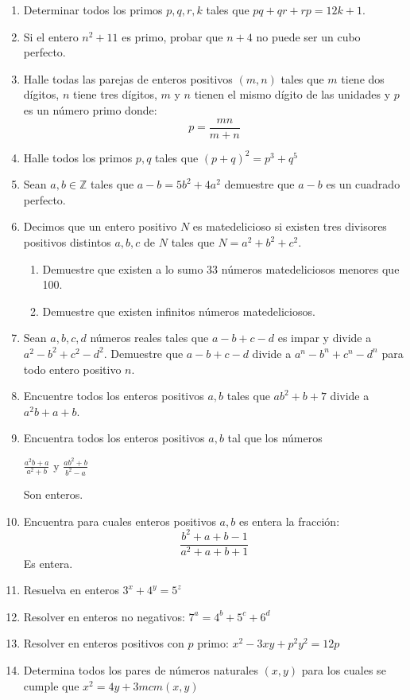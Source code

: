 \documentclass{book}
\newcommand{\Z}{\mathbb{Z}} \def\max{\mathop{\mbox{\rm máx}}} %
\begin{document}
\begin{enumerate}
		\item Determinar todos los primos $p,q,r,k$ tales que $pq+qr+rp= 12k + 1$. 
		\item Si el entero $n^2 + 11$ es primo, probar que $n + 4$ no puede ser un cubo perfecto. 
		\item Halle todas las parejas de enteros positivos $(m,n)$ tales que $m$ tiene dos dígitos, $n$ tiene tres dígitos, $m$ y 					$n$ tienen el mismo dígito de las unidades y $p$ es un número primo donde:
			$$p=\frac{mn}{m+n}$$
		\item Halle todos los primos $p,q$ tales que ${(p+q)}^2 = p^3+q^5$ 
		\item Sean $a,b\in \Z$ tales que $a-b=5b^2+4a^2$ demuestre que $a-b$ es un cuadrado perfecto.
		\item Decimos que un entero positivo $N$ es matedelicioso si existen tres divisores positivos distintos $a,b,c$ de $N$ tales que $N = a^2 + b^2 + c^2$.
			\begin{enumerate}
				 \item Demuestre que existen a lo sumo 33 números matedeliciosos menores que 100.  
				 \item Demuestre que existen infinitos números matedeliciosos. 
			\end{enumerate}
		\item Sean $a,b,c,d$ números reales tales que $a-b+c-d$ es impar y divide a $a^2-b^2+c^2-d^2$. Demuestre que
			$a-b+c-d$ divide a $a^n-b^n+c^n-d^n$ para todo entero positivo $n$.
		\item Encuentre todos los enteros positivos $a,b$ tales que $ab^2+b+7$ divide a $a^2b+a+b$.
		\item Encuentra todos los enteros positivos $a,b$ tal que los números 
			\begin{center}
				$\displaystyle\frac{a^2b+a}{a^2+b}$ y $\displaystyle\frac{ab^2+b}{b^2-a}$
			\end{center}
			Son enteros.
		\item Encuentra para cuales enteros positivos $a,b$ es entera la fracción: 
			$$\frac{b^2+a+b-1}{a^2+a+b+1}$$
			Es entera.
		\item Resuelva en enteros $3^x+4^y=5^z$
		\item Resolver en enteros no negativos: $7^a=4^b+5^c+6^d$
		\item Resolver en enteros positivos con $p$ primo: $x^2-3xy+p^2y^2=12p$ 
		\item Determina todos los pares de números naturales $(x,y)$ para los cuales se cumple que $x^2=4y+3mcm(x,y)$

\end{enumerate}
\end{document}

